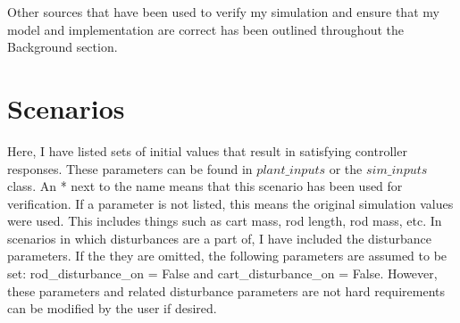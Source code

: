 \documentclass{article}
\begin{document}
Other sources that have been used to verify my simulation and ensure that my model and implementation are correct has been outlined throughout the Background section.

\section{Scenarios}

Here, I have listed sets of initial values that result in satisfying controller responses. These parameters can be found in $plant\_inputs$ or the $sim\_inputs$ class. An * next to the name means that this scenario has been used for verification. If a parameter is not listed, this means the original simulation values were used. This includes things such as cart mass, rod length, rod mass, etc. In scenarios in which disturbances are a part of, I have included the disturbance parameters. If the they are omitted, the following parameters are assumed to be set: rod\_disturbance\_on = False and cart\_disturbance\_on = False. However, these parameters and related disturbance parameters are not hard requirements can be modified by the user if desired.
\end{document}
